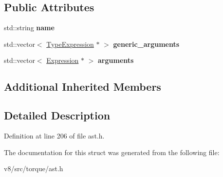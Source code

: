 \subsection*{Public Attributes}
\begin{DoxyCompactItemize}
\item 
\mbox{\label{structv8_1_1internal_1_1torque_1_1IntrinsicCallExpression_a52e7804ef13a18f14c0510acf3ff8b39}} 
std\+::string {\bfseries name}
\item 
\mbox{\label{structv8_1_1internal_1_1torque_1_1IntrinsicCallExpression_a22379da72ae619e0573de59ab994e80f}} 
std\+::vector$<$ \mbox{\hyperlink{structv8_1_1internal_1_1torque_1_1TypeExpression}{Type\+Expression}} $\ast$ $>$ {\bfseries generic\+\_\+arguments}
\item 
\mbox{\label{structv8_1_1internal_1_1torque_1_1IntrinsicCallExpression_ac3d9c651371260f0bb2d439d29880232}} 
std\+::vector$<$ \mbox{\hyperlink{structv8_1_1internal_1_1torque_1_1Expression}{Expression}} $\ast$ $>$ {\bfseries arguments}
\end{DoxyCompactItemize}
\subsection*{Additional Inherited Members}


\subsection{Detailed Description}


Definition at line 206 of file ast.\+h.



The documentation for this struct was generated from the following file\+:\begin{DoxyCompactItemize}
\item 
v8/src/torque/ast.\+h\end{DoxyCompactItemize}
